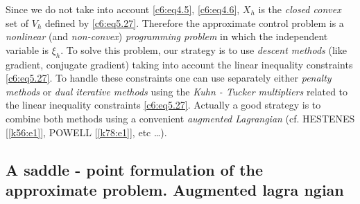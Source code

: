  Since we do not take into account \eqref{c6:eq4.5}, \eqref{c6:eq4.6}, 
 $X_h$ is the \textit{closed convex} set of $V_h$ defined by 
 \eqref{c6:eq5.27}. Therefore the approximate control problem is a 
 \textit{nonlinear} (and \textit{non-convex}) \textit{programming 
 problem} in which the independent variable is $\xi_h$. To solve this 
 problem, our strategy is to use \textit{descent methods} (like 
 gradient, conjugate gradient) taking into account the linear 
 inequality constraints \eqref{c6:eq5.27}. To handle these constraints 
 one can use separately either \textit{penalty methods} or \textit{dual 
 iterative methods} using the \textit{Kuhn - Tucker multipliers} 
 related to the linear inequality constraints \eqref{c6:eq5.27}. 
 Actually a good strategy is to combine both methods using a convenient 
 \textit{augmented Lagrangian} (cf. HESTENES [\ref{k56:e1}], POWELL
        [\ref{k78:e1}], etc
 \dots ).
  
 \subsection{A saddle - point formulation of the approximate problem. 
 Augmented lagra ngian}\label{c6:ss6.2}%
 
